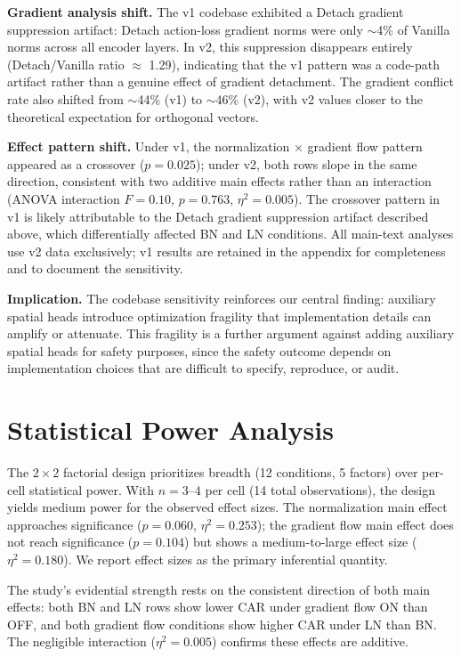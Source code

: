 \textbf{Gradient analysis shift.} The v1 codebase exhibited a Detach gradient suppression artifact: Detach action-loss gradient norms were only $\sim$4\% of Vanilla norms across all encoder layers. In v2, this suppression disappears entirely (Detach/Vanilla ratio $\approx$ 1.29), indicating that the v1 pattern was a code-path artifact rather than a genuine effect of gradient detachment. The gradient conflict rate also shifted from $\sim$44\% (v1) to $\sim$46\% (v2), with v2 values closer to the theoretical expectation for orthogonal vectors.

\textbf{Effect pattern shift.} Under v1, the normalization $\times$ gradient flow pattern appeared as a crossover ($p{=}0.025$); under v2, both rows slope in the same direction, consistent with two additive main effects rather than an interaction (ANOVA interaction $F{=}0.10$, $p{=}0.763$, $\eta^2{=}0.005$). The crossover pattern in v1 is likely attributable to the Detach gradient suppression artifact described above, which differentially affected BN and LN conditions. All main-text analyses use v2 data exclusively; v1 results are retained in the appendix for completeness and to document the sensitivity.

\textbf{Implication.} The codebase sensitivity reinforces our central finding: auxiliary spatial heads introduce optimization fragility that implementation details can amplify or attenuate. This fragility is a further argument against adding auxiliary spatial heads for safety purposes, since the safety outcome depends on implementation choices that are difficult to specify, reproduce, or audit.

\section{Statistical Power Analysis}
\label{app:stat_power}

The $2{\times}2$ factorial design prioritizes breadth (12 conditions, 5 factors) over per-cell statistical power. With $n{=}3$--$4$ per cell (14 total observations), the design yields medium power for the observed effect sizes. The normalization main effect approaches significance ($p{=}0.060$, $\eta^2{=}0.253$); the gradient flow main effect does not reach significance ($p{=}0.104$) but shows a medium-to-large effect size ($\eta^2{=}0.180$). We report effect sizes as the primary inferential quantity.

The study's evidential strength rests on the consistent direction of both main effects: both BN and LN rows show lower CAR under gradient flow ON than OFF, and both gradient flow conditions show higher CAR under LN than BN. The negligible interaction ($\eta^2{=}0.005$) confirms these effects are additive.

